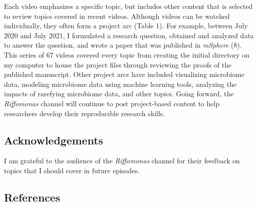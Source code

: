 \documentclass[
]{article}
\begin{document}
Each video emphasizes a specific topic, but includes other content that
is selected to review topics covered in recent videos. Although videos
can be watched individually, they often form a project arc (Table 1).
For example, between July 2020 and July 2021, I formulated a research
question, obtained and analyzed data to answer the question, and wrote a
paper that was published in \emph{mSphere} (8). This series of 67 videos
covered every topic from creating the initial directory on my computer
to house the project files through reviewing the proofs of the published
manuscript. Other project arcs have included visualizing microbiome
data, modeling microbiome data using machine learning tools, analyzing
the impacts of rarefying microbiome data, and other topics. Going
forward, the \emph{Riffomonas} channel will continue to post
project-based content to help researchers develop their reproducible
research skills.

\hypertarget{acknowledgements}{%
\subsection{Acknowledgements}\label{acknowledgements}}

I am grateful to the audience of the \emph{Riffomonas} channel for their
feedback on topics that I should cover in future episodes.

\newpage

\hypertarget{references}{%
\subsection{References}\label{references}}
\end{document}
